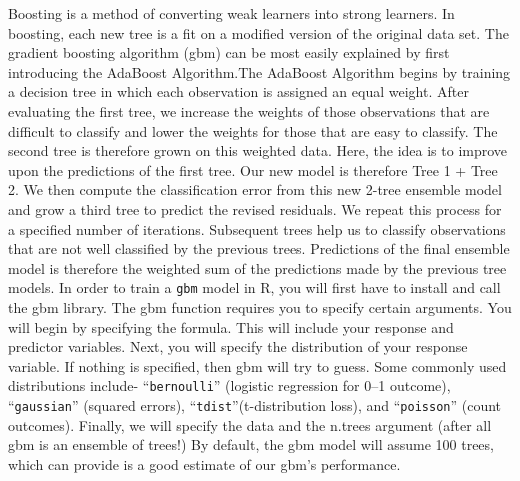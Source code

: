 \documentclass[
]{book}
\newenvironment{Shaded}{\begin{snugshade}}{\end{snugshade}}
\newcommand{\AttributeTok}[1]{\textcolor[rgb]{0.77,0.63,0.00}{#1}}
\newcommand{\CommentTok}[1]{\textcolor[rgb]{0.56,0.35,0.01}{\textit{#1}}}
\newcommand{\DecValTok}[1]{\textcolor[rgb]{0.00,0.00,0.81}{#1}}
\newcommand{\FunctionTok}[1]{\textcolor[rgb]{0.00,0.00,0.00}{#1}}
\newcommand{\NormalTok}[1]{#1}
\newcommand{\OtherTok}[1]{\textcolor[rgb]{0.56,0.35,0.01}{#1}}
\newcommand{\SpecialCharTok}[1]{\textcolor[rgb]{0.00,0.00,0.00}{#1}}
\newcommand{\StringTok}[1]{\textcolor[rgb]{0.31,0.60,0.02}{#1}}
\begin{document}
Boosting is a method of converting weak learners into strong learners. In boosting, each new tree is a fit on a modified version of the original data set. The gradient boosting algorithm (gbm) can be most easily explained by first introducing the AdaBoost Algorithm.The AdaBoost Algorithm begins by training a decision tree in which each observation is assigned an equal weight. After evaluating the first tree, we increase the weights of those observations that are difficult to classify and lower the weights for those that are easy to classify. The second tree is therefore grown on this weighted data. Here, the idea is to improve upon the predictions of the first tree. Our new model is therefore Tree 1 + Tree 2. We then compute the classification error from this new 2-tree ensemble model and grow a third tree to predict the revised residuals. We repeat this process for a specified number of iterations. Subsequent trees help us to classify observations that are not well classified by the previous trees. Predictions of the final ensemble model is therefore the weighted sum of the predictions made by the previous tree models.
In order to train a \texttt{gbm} model in R, you will first have to install and call the gbm library. The gbm function requires you to specify certain arguments. You will begin by specifying the formula. This will include your response and predictor variables. Next, you will specify the distribution of your response variable. If nothing is specified, then gbm will try to guess. Some commonly used distributions include- ``\texttt{bernoulli}'' (logistic regression for 0--1 outcome), ``\texttt{gaussian}'' (squared errors), ``\texttt{tdist}''(t-distribution loss), and ``\texttt{poisson}'' (count outcomes). Finally, we will specify the data and the n.trees argument (after all gbm is an ensemble of trees!) By default, the gbm model will assume 100 trees, which can provide is a good estimate of our gbm's performance.

\begin{Shaded}
\end{Shaded}
\end{document}
